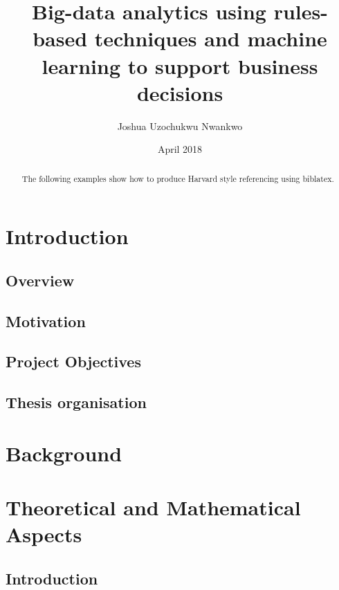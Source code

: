\documentclass[12pt, letterpaper, titlepage]{report}
\title{\textbf{Big-data analytics using rules-based techniques and machine learning to support business decisions}}
\author{Joshua Uzochukwu Nwankwo}
\date{April 2018}
\begin{document}
\maketitle
\newpage

\begin{abstract}
The following examples show how to produce Harvard style referencing using biblatex.
\end{abstract}

\tableofcontents
\newpage

\chapter{Introduction}
\section{Overview}
\section{Motivation}
\section{Project Objectives}
\section{Thesis organisation}

\chapter{Background}

\chapter{Theoretical and Mathematical Aspects}
\section{Introduction}
\end{document}
